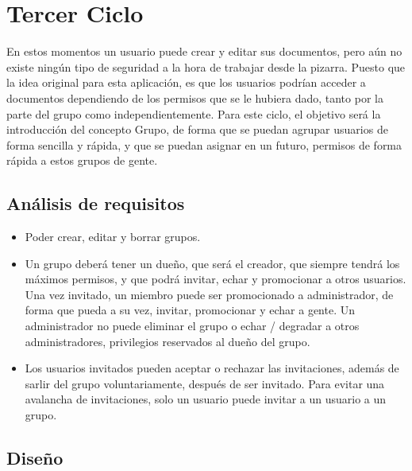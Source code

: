 \section{Tercer Ciclo} %
\label{sec:tercer_ciclo}

En estos momentos un usuario puede crear y editar sus documentos, pero aún no existe ningún tipo de seguridad a la hora de trabajar desde la pizarra. Puesto que la idea original para esta aplicación, es que los usuarios podrían acceder a documentos dependiendo de los permisos que se le hubiera dado, tanto por la parte del grupo como independientemente. Para este ciclo, el objetivo será la introducción del concepto Grupo, de forma que se puedan agrupar usuarios de forma sencilla y rápida, y que se puedan asignar en un futuro, permisos de forma rápida a estos grupos de gente.

\subsection{Análisis de requisitos} %
\label{sub:análisis_de_requisitos}

\begin{itemize}
  \item Poder crear, editar y borrar grupos.
  \item Un grupo deberá tener un dueño, que será el creador, que siempre tendrá los máximos permisos, y que podrá invitar, echar y promocionar a otros usuarios. Una vez invitado, un miembro puede ser promocionado a administrador, de forma que pueda a su vez, invitar, promocionar y echar a gente. Un administrador no puede eliminar el grupo o echar / degradar a otros administradores, privilegios reservados al dueño del grupo.
  \item Los usuarios invitados pueden aceptar o rechazar las invitaciones, además de sarlir del grupo voluntariamente, después de ser invitado. Para evitar una avalancha de invitaciones, solo un usuario puede invitar a un usuario a un grupo.
\end{itemize}


\subsection{Diseño} %
\label{sub:diseño}

